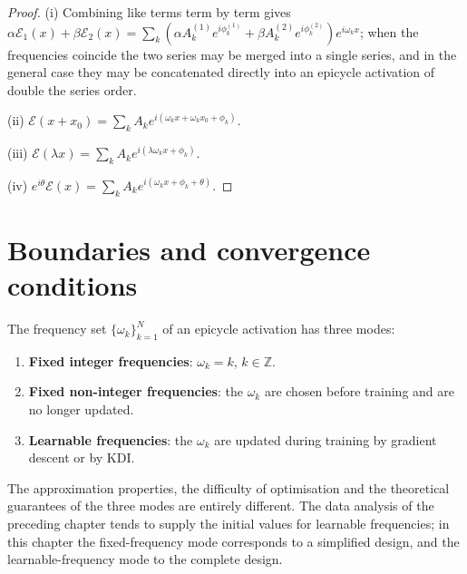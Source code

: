 \begin{proof}
(i) Combining like terms term by term gives $\alpha\mathcal E_1(x)+\beta\mathcal E_2(x)=\sum_k(\alpha A_k^{(1)}e^{i\phi_k^{(1)}}+\beta A_k^{(2)}e^{i\phi_k^{(2)}})e^{i\omega_k x}$; when the frequencies coincide the two series may be merged into a single series, and in the general case they may be concatenated directly into an epicycle activation of double the series order.

(ii) $\mathcal E(x+x_0)=\sum_k A_k e^{i(\omega_k x+\omega_k x_0+\phi_k)}$.

(iii) $\mathcal E(\lambda x)=\sum_k A_k e^{i(\lambda\omega_k x+\phi_k)}$.

(iv) $e^{i\theta}\mathcal E(x)=\sum_k A_k e^{i(\omega_k x+\phi_k+\theta)}$.
\end{proof}

\section{Boundaries and convergence conditions}

\begin{definition}\label{def:frequency-modes}
The frequency set $\{\omega_k\}_{k=1}^{N}$ of an epicycle activation has three modes:
\begin{enumerate}[label=(\roman*)]
    \item \textbf{Fixed integer frequencies}: $\omega_k=k$, $k\in\mathbb Z$.
    \item \textbf{Fixed non-integer frequencies}: the $\omega_k$ are chosen before training and are no longer updated.
    \item \textbf{Learnable frequencies}: the $\omega_k$ are updated during training by gradient descent or by KDI.
\end{enumerate}
The approximation properties, the difficulty of optimisation and the theoretical guarantees of the three modes are entirely different. The data analysis of the preceding chapter tends to supply the initial values for learnable frequencies; in this chapter the fixed-frequency mode corresponds to a simplified design, and the learnable-frequency mode to the complete design.
\end{definition}

